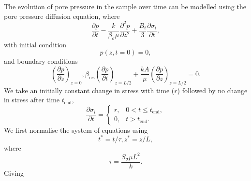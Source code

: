 The evolution of pore pressure in the sample over time can be modelled using the pore pressure diffusion equation, where 
\begin{equation}\label{eq:ppeqramp}
	\frac{\partial p}{\partial t} -\frac{k}{\beta_{\sigma} \mu}\frac{\partial^2 p}{\partial z^2} + \frac{B_i}{3} \frac{\partial \sigma_i}{\partial t},
\end{equation}
with initial condition
\begin{equation}
    p(z,t=0)=0,
\end{equation}
and boundary conditions
\begin{subequations}
\begin{equation}
    \left(\frac{\partial p }{\partial z}\right)_{z=0},
\end{equation}
\begin{equation}
    \beta_{\mathrm{res}}\left(\frac{\partial p }{\partial t}\right)_{z=L/2} +
    \frac{kA}{\mu}\left(\frac{\partial p }{\partial z}\right)_{z=L/2} = 0.
\end{equation}
\end{subequations}
We take an initially constant change in stress with time ($r$) followed by no change in stress after time $t_{\mathrm{end}}$,
\begin{equation}\label{eq:rampsource}
\frac{\partial \sigma_i}{\partial t} =
	\begin{cases}
		r, & 0< t \leq t_{\mathrm{end}},\\
		0, & t > t_{\mathrm{end}}.
	\end{cases}	
\end{equation}
We first normalise the system of equations using
\begin{subequations}
\begin{equation}
    t^* = t/ \tau,
\end{equation}
\begin{equation}
    z^* = z/L,
\end{equation}
\end{subequations}
where
\begin{equation}
    \tau = \frac{S_{\sigma}\mu L^2}{k}.
\end{equation}
Giving
